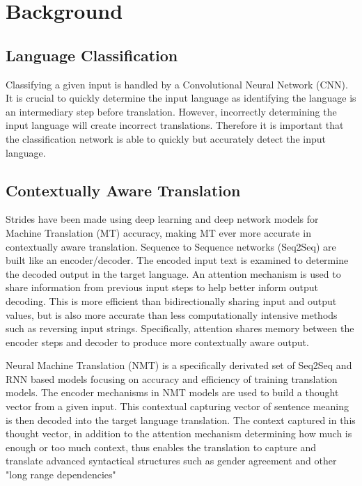 \documentclass[10pt,a4paper]{report}
\begin{document}
\clearpage

\section{Background}

\subsection{Language Classification}

  Classifying a given input is handled by a Convolutional Neural Network (CNN). It is crucial to quickly determine the input language as identifying the language is an intermediary step before translation. However, incorrectly determining the input language will create incorrect translations. Therefore it is important that the classification network is able to quickly but accurately detect the input language.

\subsection{Contextually Aware Translation}

  Strides have been made using deep learning and deep network models for Machine Translation (MT) accuracy, making MT ever more accurate in contextually aware translation. Sequence to Sequence networks (Seq2Seq) are built like an encoder/decoder. The encoded input text is examined to determine the decoded output in the target language. An attention mechanism is used to share information from previous input steps to help better inform output decoding. This is more efficient than bidirectionally sharing input and output values, but is also more accurate than less computationally intensive methods such as reversing input strings. Specifically, attention shares memory between the encoder steps and decoder to produce more contextually aware output.

  Neural Machine Translation (NMT) is a specifically derivated set of Seq2Seq and RNN based models focusing on accuracy and efficiency of training translation models. The encoder mechanisms in NMT models are used to build a thought vector from a given input. This contextual capturing vector of sentence meaning is then decoded into the target language translation. The context captured in this thought vector, in addition to the attention mechanism determining how much is enough or too much context, thus enables the translation to capture and translate advanced syntactical structures such as gender agreement and other "long range dependencies"
\end{document}
